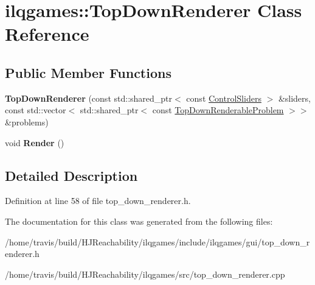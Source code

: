 \hypertarget{classilqgames_1_1_top_down_renderer}{}\section{ilqgames\+:\+:Top\+Down\+Renderer Class Reference}
\label{classilqgames_1_1_top_down_renderer}
\subsection*{Public Member Functions}
\begin{DoxyCompactItemize}
\item 
{\bfseries Top\+Down\+Renderer} (const std\+::shared\+\_\+ptr$<$ const \hyperlink{classilqgames_1_1_control_sliders}{Control\+Sliders} $>$ \&sliders, const std\+::vector$<$ std\+::shared\+\_\+ptr$<$ const \hyperlink{classilqgames_1_1_top_down_renderable_problem}{Top\+Down\+Renderable\+Problem} $>$$>$ \&problems)\hypertarget{classilqgames_1_1_top_down_renderer_a14a2372beb58497e92ab11bf6d68e572}{}\label{classilqgames_1_1_top_down_renderer_a14a2372beb58497e92ab11bf6d68e572}

\item 
void {\bfseries Render} ()\hypertarget{classilqgames_1_1_top_down_renderer_af50dc993130fbca96d4269e307bf2dae}{}\label{classilqgames_1_1_top_down_renderer_af50dc993130fbca96d4269e307bf2dae}

\end{DoxyCompactItemize}


\subsection{Detailed Description}


Definition at line 58 of file top\+\_\+down\+\_\+renderer.\+h.



The documentation for this class was generated from the following files\+:\begin{DoxyCompactItemize}
\item 
/home/travis/build/\+H\+J\+Reachability/ilqgames/include/ilqgames/gui/top\+\_\+down\+\_\+renderer.\+h\item 
/home/travis/build/\+H\+J\+Reachability/ilqgames/src/top\+\_\+down\+\_\+renderer.\+cpp\end{DoxyCompactItemize}
